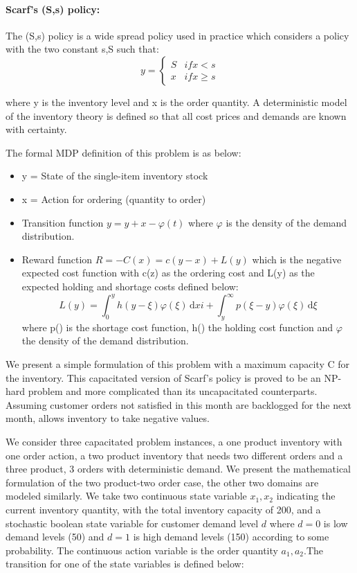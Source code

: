 \paragraph*{Scarf's (S,s) policy:}
The (S,s) policy is a wide spread policy used in practice which considers a policy with the two constant s,S such that: 
\[y = \begin{cases}
S & if x<s \\
x & if x \geq s
\end{cases}\]

where y is the inventory level and x is the order quantity.  A deterministic model of the inventory theory is defined so that all cost prices and demands are known with certainty. 

The formal MDP definition of this problem is as below:
\begin{itemize}
\item y = State of the single-item inventory stock
\item x = Action for ordering (quantity to order) 
\item Transition function $y = y + x - \varphi(t) $ where $\varphi$ is the density of the demand distribution.
\item Reward function $R = -C(x) = c(y-x)+L(y)$ which is the negative expected cost function with c(z) as the ordering cost and L(y) as the expected holding and shortage costs defined below: 
\[ 
L(y) =\int_0^y \! h(y-\xi)\varphi(\xi) \, \mathrm{d} xi + \int_y^{\infty} \! p(\xi - y)\varphi(\xi) \, \mathrm{d} \xi 
\]
where p() is the shortage cost function, h() the holding cost function and $\varphi$ the density of the demand distribution. 
\end{itemize}


We present a simple formulation of this problem with a maximum capacity C for the inventory. This capacitated version of Scarf's policy is proved to be an NP-hard problem \cite{bitran} and more complicated than its uncapacitated counterparts. Assuming customer orders not satisfied in this month are backlogged for the next month, allows inventory to take negative values. 

We consider three capacitated problem instances, a one product inventory with one order action, a two product inventory that needs two different orders and a three product, 3 orders with deterministic demand.
We present the mathematical formulation of the two product-two order case, the other two domains are modeled similarly. We take two continuous state variable $x_1,x_2$ indicating the current inventory quantity, with the total inventory capacity of 200, and a stochastic boolean state variable for customer demand level $d$ where $d=0$ is low demand levels (50) and $d=1$ is high demand levels (150) according to some probability. The continuous action variable is the order quantity $a_1,a_2$.The transition for one of the state variables is defined below:
 
